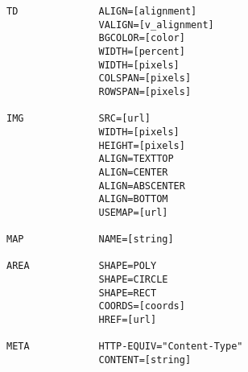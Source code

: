 \begin{verbatim}
TD              ALIGN=[alignment]
                VALIGN=[v_alignment]
                BGCOLOR=[color]
                WIDTH=[percent]
                WIDTH=[pixels]
                COLSPAN=[pixels]
                ROWSPAN=[pixels]

IMG             SRC=[url]
                WIDTH=[pixels]
                HEIGHT=[pixels]
                ALIGN=TEXTTOP
                ALIGN=CENTER
                ALIGN=ABSCENTER
                ALIGN=BOTTOM
                USEMAP=[url]
                
MAP             NAME=[string]

AREA            SHAPE=POLY
                SHAPE=CIRCLE
                SHAPE=RECT
                COORDS=[coords]
                HREF=[url]
                
META            HTTP-EQUIV="Content-Type"
                CONTENT=[string]
                
\end{verbatim}


